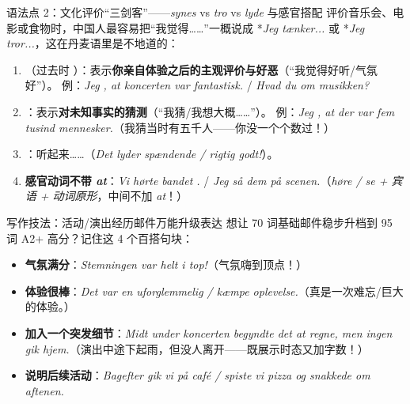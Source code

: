 \begin{grammatikbox}{语法点 2：文化评价“三剑客”——\textit{synes} vs \textit{tro} vs \textit{lyde} 与感官搭配}
评价音乐会、电影或食物时，中国人最容易把“我觉得……”一概说成 *\textit{Jeg tænker...} 或 *\textit{Jeg tror...}，这在丹麦语里是不地道的：
\begin{enumerate}
  \item {}（过去时 ）：表示\textbf{你亲自体验之后的主观评价与好恶}（“我觉得好听/气氛好”）。\newline
    例：\textit{Jeg , at koncerten var fantastisk.} / \textit{Hvad  du om musikken?}
  \item {}：表示\textbf{对未知事实的猜测}（“我猜/我想大概……”）。\newline
    例：\textit{Jeg , at der var fem tusind mennesker.}（我猜当时有五千人——你没一个个数过！）
  \item {}：听起来……（\textit{Det lyder spændende / rigtig godt!}）。
  \item \textbf{感官动词不带 \textit{at}}：\textit{Vi hørte bandet .} / \textit{Jeg så dem  på scenen.}（\textit{høre / se + 宾语 + 动词原形}，中间不加 \textit{at}！）
\end{enumerate}
\end{grammatikbox}

\begin{grammatikbox}{写作技法：活动/演出经历邮件万能升级表达}
想让 70 词基础邮件稳步升档到 95 词 A2+ 高分？记住这 4 个百搭句块：
\begin{itemize}
  \item \textbf{气氛满分}：\textit{Stemningen var helt i top!}（气氛嗨到顶点！）
  \item \textbf{体验很棒}：\textit{Det var en uforglemmelig / kæmpe oplevelse.}（真是一次难忘/巨大的体验。）
  \item \textbf{加入一个突发细节}：\textit{Midt under koncerten begyndte det at regne, men ingen gik hjem.}（演出中途下起雨，但没人离开——既展示时态又加字数！）
  \item \textbf{说明后续活动}：\textit{Bagefter gik vi på café / spiste vi pizza og snakkede om aftenen.}
\end{itemize}
\end{grammatikbox}



